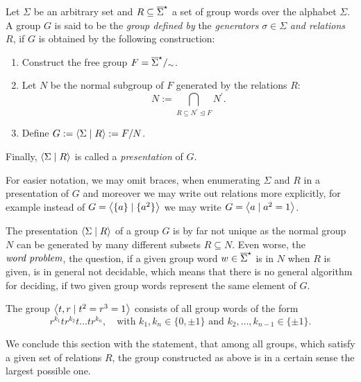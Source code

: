 \begin{definition}
\label{dfn_GrpConstructGenRel}
Let $\Sigma$ be an arbitrary set and $R \subseteq {\overline{\Sigma}}^{\star}$ a set of group words over the alphabet $\Sigma$. A group $G$ is said to be the \emph{group defined by} the \emph{generators} $\sigma \in \Sigma$ \emph{and relations} $R$, if $G$ is obtained by the following construction:
\begin{enumerate}
\item Construct the free group $F = {\overline{\Sigma}}^{\star}/_{\sim}$.
\item Let $N$ be the normal subgroup of $F$ generated by the relations $R$:
\begin{equation*}
N := \bigcap_{R \subseteq N^{\prime} \unlhd F} N^{\prime}.
\end{equation*}
\item Define $G := \left\langle \Sigma \mid R \right\rangle := F/N$.
\end{enumerate}
Finally, $\left\langle \Sigma \mid R \right\rangle$ is called a \emph{presentation} of $G$.

For easier notation, we may omit braces, when enumerating $\Sigma$ and $R$ in a presentation of $G$ and moreover we may write out relations more explicitly, for example instead of $G = \left\langle \{a\} \mid \{a^2\} \right\rangle$ we may write $G = \left\langle a \mid a^2 = 1 \right\rangle$.
\end{definition}

\begin{remark}
The presentation $\left\langle \Sigma \mid R \right\rangle$ of a group $G$ is by far not unique as the normal group $N$ can be generated by many different subsets $R \subseteq N$. Even worse, the $\emph{word problem}$, \ie the question, if a given group word $w \in {\overline{\Sigma}}^{\star}$ is in $N$ when $R$ is given, is in general not decidable, which means that there is no general algorithm for deciding, if two given group words represent the same element of $G$.
\end{remark}

\begin{example}
The group $\left\langle t,r \mid t^2 = r^3 = 1 \right\rangle$ consists of all group words of the form
\begin{equation*}
\label{ex_RTGroup}
r^{k_1} t r^{k_2} t \dots t r^{k_n}, \quad 
\text {with } k_1, k_n \in \{0,\pm 1\} \text{ and } k_2, \dots, k_{n-1} \in \{\pm 1\}.
\end{equation*}
\end{example}
We conclude this section with the statement, that among all groups, which satisfy a given set of relations $R$, the group constructed as above is in a certain sense the largest possible one.

